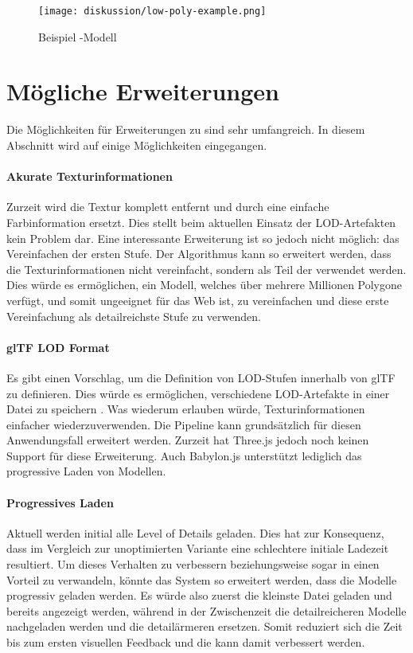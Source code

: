 \begin{figure}[H]
  \centering
  \texttt{[image: diskussion/low-poly-example.png]}
  \caption{Beispiel -Modell}
  \label{fig:lowPolyExample}
\end{figure}

\section{Mögliche Erweiterungen}
Die Möglichkeiten für Erweiterungen zu  sind sehr umfangreich. In diesem Abschnitt wird auf einige Möglichkeiten eingegangen.

\paragraph{Akurate Texturinformationen}
Zurzeit wird die Textur komplett entfernt und durch eine einfache Farbinformation ersetzt. Dies stellt beim aktuellen Einsatz der LOD-Artefakten kein Problem dar. Eine interessante Erweiterung ist so jedoch nicht möglich: das Vereinfachen der ersten Stufe. Der Algorithmus kann so erweitert werden, dass die Texturinformationen nicht vereinfacht, sondern als Teil der  verwendet werden. Dies würde es ermöglichen, ein Modell, welches über mehrere Millionen Polygone verfügt, und somit ungeeignet für das Web ist, zu vereinfachen und diese erste Vereinfachung als detailreichste Stufe zu verwenden.

\paragraph{glTF LOD Format}
Es gibt einen Vorschlag, um die Definition von LOD-Stufen innerhalb von glTF zu definieren. Dies würde es ermöglichen, verschiedene LOD-Artefakte in einer Datei zu speichern \cite{glTFExtensionLOD}. Was wiederum erlauben würde, Texturinformationen einfacher wiederzuverwenden. Die Pipeline kann grundsätzlich für diesen Anwendungsfall erweitert werden.
Zurzeit hat Three.js jedoch noch keinen Support für diese Erweiterung. Auch Babylon.js unterstützt lediglich das progressive Laden von Modellen. \cite{babylonProgressiveLoading}

\paragraph{Progressives Laden}
Aktuell werden initial alle Level of Details geladen. Dies hat zur Konsequenz, dass im Vergleich zur unoptimierten Variante eine schlechtere initiale Ladezeit resultiert. Um dieses Verhalten zu verbessern beziehungsweise sogar in einen Vorteil zu verwandeln, könnte das System so erweitert werden, dass die Modelle progressiv geladen werden. Es würde also zuerst die kleinste Datei geladen und bereits angezeigt werden, während in der Zwischenzeit die detailreicheren Modelle nachgeladen werden und die detailärmeren ersetzen. Somit reduziert sich die Zeit bis zum ersten visuellen Feedback und die  kann damit verbessert werden.


